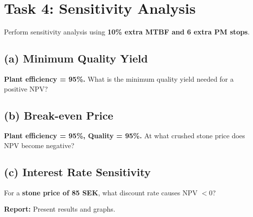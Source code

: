 \documentclass[a4paper,12pt]{article}
\begin{document}
\section{Task 4: Sensitivity Analysis}
Perform sensitivity analysis using \textbf{10\% extra MTBF and 6 extra PM stops}.

\subsection{(a) Minimum Quality Yield}
\textbf{Plant efficiency = 95\%.} What is the minimum quality yield needed for a positive NPV?

\subsection{(b) Break-even Price}
\textbf{Plant efficiency = 95\%, Quality = 95\%.} At what crushed stone price does NPV become negative?

\subsection{(c) Interest Rate Sensitivity}
For a \textbf{stone price of 85 SEK}, what discount rate causes NPV $<0$?

\textbf{Report:} Present results and graphs.
\end{document}
